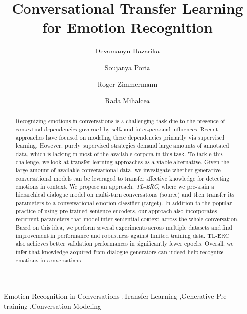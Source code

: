 \documentclass[preprint,3pt]{elsarticle}
\begin{document}
\begin{frontmatter}


\title{Conversational Transfer Learning for Emotion Recognition}



\author[address1]{Devamanyu Hazarika}

\author[address3]{Soujanya Poria}

\author[address1]{Roger Zimmermann}

\author[address2]{Rada Mihalcea}





\address[address1]{School of Computing, National University of Singapore}
\address[address2]{Computer Science \& Engineering, University of Michigan, USA}
\address[address3]{Information Systems Technology and Design, Singapore University of Technology and Design}





\begin{abstract}
Recognizing emotions in conversations is a challenging task due to the presence of contextual dependencies governed by self- and inter-personal influences. Recent approaches have focused on modeling these dependencies primarily via supervised learning. However, purely supervised strategies demand large amounts of annotated data, which is lacking in most of the available corpora in this task. To tackle this challenge, we look at transfer learning approaches as a viable alternative. Given the large amount of available conversational data, we investigate whether generative conversational models can be leveraged to transfer affective knowledge for detecting emotions in context. We propose an approach, \textit{TL-ERC}, where we pre-train a hierarchical dialogue model on multi-turn conversations (source) and then transfer its parameters to a conversational emotion classifier (target). In addition to the popular practice of using pre-trained sentence encoders, our approach also incorporates recurrent parameters that model inter-sentential context across the whole conversation. Based on this idea, we perform several experiments across multiple datasets and find improvement in performance and robustness against limited training data. TL-ERC also achieves better validation performances in significantly fewer epochs. Overall, we infer that knowledge acquired from dialogue generators can indeed help recognize emotions in conversations.
\end{abstract}

\begin{keyword}
Emotion Recognition in Conversations \sep Transfer Learning \sep Generative Pre-training \sep Conversation Modeling
\end{keyword}

\end{frontmatter}
\end{document}
